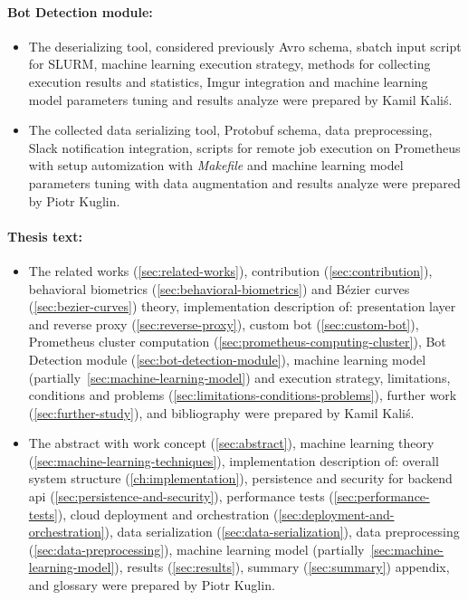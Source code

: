\begin{minipage}{\textwidth}
    \paragraph{Bot Detection module:}
    \begin{itemize}[label=$\bullet$]
        \item The deserializing tool, considered previously Avro schema, sbatch input script for SLURM, machine learning execution strategy, methods for collecting execution results and statistics, Imgur integration and machine learning model parameters tuning and results analyze were prepared by Kamil Kaliś.
        \item The collected data serializing tool, Protobuf schema, data preprocessing, Slack notification integration, scripts for remote job execution on Prometheus with setup automization with \textit{Makefile} and machine learning model parameters tuning with data augmentation and results analyze were prepared by Piotr Kuglin.
    \end{itemize}
\end{minipage}

\begin{minipage}{\textwidth}
    \paragraph{Thesis text:}
    \begin{itemize}[label=$\bullet$]
        \item The related works (\ref{sec:related-works}), contribution (\ref{sec:contribution}), behavioral biometrics (\ref{sec:behavioral-biometrics}) and Bézier curves (\ref{sec:bezier-curves}) theory, implementation description of: presentation layer and reverse proxy (\ref{sec:reverse-proxy}), custom bot (\ref{sec:custom-bot}), Prometheus cluster computation (\ref{sec:prometheus-computing-cluster}), Bot Detection module (\ref{sec:bot-detection-module}), machine learning model (partially~\ref{sec:machine-learning-model}) and execution strategy, limitations, conditions and problems (\ref{sec:limitations-conditions-problems}), further work (\ref{sec:further-study}), and bibliography were prepared by Kamil Kaliś.
        \item The abstract with work concept (\ref{sec:abstract}), machine learning theory (\ref{sec:machine-learning-techniques}), implementation description of: overall system structure (\ref{ch:implementation}), persistence and security for backend \gls{api} (\ref{sec:persistence-and-security}), performance tests (\ref{sec:performance-tests}), cloud deployment and orchestration (\ref{sec:deployment-and-orchestration}), data serialization (\ref{sec:data-serialization}), data preprocessing (\ref{sec:data-preprocessing}), machine learning model (partially~\ref{sec:machine-learning-model}), results (\ref{sec:results}), summary (\ref{sec:summary}) appendix, and glossary were prepared by Piotr Kuglin.
    \end{itemize}
\end{minipage}
